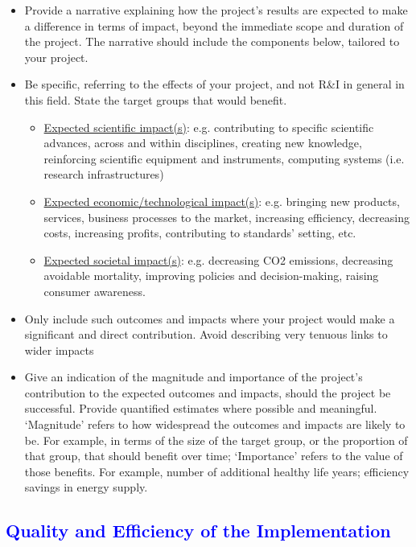 \documentclass[11pt,a4paper]{article}
\begin{document}
\color{gray}
\begin{itemize}
    \item Provide a narrative explaining how the project’s results are expected to make a difference in terms of impact, beyond the immediate scope and duration of the project. The narrative should include the components below, tailored to your project.
    \item Be specific, referring to the effects of your project, and not R\&I in general in this field. State the target groups that would benefit.
    \begin{itemize}
        \item \underline{Expected scientific impact(s)}: e.g. contributing to specific scientific advances, across and within disciplines, creating new knowledge, reinforcing scientific equipment and instruments, computing systems (i.e. research infrastructures)
        \item \underline{Expected economic/technological impact(s)}: e.g. bringing new products, services, business processes to the market, increasing efficiency, decreasing costs, increasing profits, contributing to standards’ setting, etc. 
        \item \underline{Expected societal impact(s)}: e.g. decreasing CO2 emissions, decreasing avoidable mortality, improving policies and decision-making, raising consumer awareness. 
    \end{itemize}
    \item Only include such outcomes and impacts where your project would make a significant and direct contribution. Avoid describing very tenuous links to wider impacts
    \item Give an indication of the magnitude and importance of the project’s contribution to the expected outcomes and impacts, should the project be successful. Provide quantified estimates where possible and meaningful. ‘Magnitude’ refers to how widespread the outcomes and impacts are likely to be. For example, in terms of the size of the target group, or the proportion of that group, that should benefit over time; ‘Importance’ refers to the value of those benefits. For example, number of additional healthy life years; efficiency savings in energy supply.
\end{itemize}
\color{black}



\textcolor{Blue}{\section{Quality and Efficiency of the Implementation}}
\end{document}
